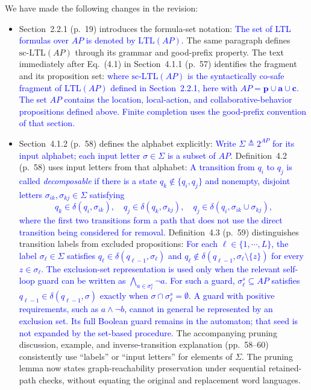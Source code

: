 \documentclass[11pt]{article}
\newcommand{\change}[1]{\textcolor{blue}{#1}}
\begin{document}
We have made the following changes in the revision:
\begin{itemize}
\item Section~2.2.1 (p.~19) introduces the formula-set notation:
\change{The set of LTL formulas over $AP$ is denoted by $\mathrm{LTL}(AP)$.}
The same paragraph defines $\mathrm{sc\mbox{-}LTL}(AP)$ through its grammar
and good-prefix property. The text immediately after Eq.~(4.1) in
Section~4.1.1 (p.~57) identifies the fragment and its proposition set:
\change{where $\mathrm{sc\mbox{-}LTL}(AP)$ is the syntactically co-safe fragment
of $\mathrm{LTL}(AP)$ defined in Section~2.2.1,
here with $AP=\mathbf{p}\cup\mathbf{a}\cup\mathbf{c}$.
The set $AP$ contains the location, local-action, and collaborative-behavior
propositions defined above.
Finite completion uses the good-prefix convention of that section.}
\item Section~4.1.2 (p.~58) defines the alphabet explicitly:
\change{Write $\Sigma\triangleq2^{AP}$ for its input alphabet; each input
letter $\sigma\in\Sigma$ is a subset of $AP$.}
Definition~4.2 (p.~58) uses input letters from that alphabet:
\change{A transition from $q_i$ to $q_j$ is called \emph{decomposable} if
there is a state $q_k\notin\{q_i,q_j\}$ and nonempty, disjoint letters
$\sigma_{ik},\sigma_{kj}\in\Sigma$ satisfying
\[
q_k\in\delta(q_i,\sigma_{ik}),\quad
q_j\in\delta(q_k,\sigma_{kj}),\quad
q_j\in\delta(q_i,\sigma_{ik}\cup\sigma_{kj}),
\]
where the first two transitions form a path that does not use the direct
transition being considered for removal.}
Definition~4.3 (p.~59) distinguishes transition labels from excluded propositions:
\change{For each
$\ell \in \{1,\cdots,L\}$, the label $\sigma_{\ell}\in\Sigma$
satisfies $q_{\ell}\in\delta(q_{\ell-1},\sigma_{\ell})$ and
$q_{\ell}\notin\delta(q_{\ell-1},\sigma_{\ell}\setminus\{z\})$ for every
$z\in\sigma_{\ell}$.}
\change{The exclusion-set representation is used only when the relevant
self-loop guard can be written as
$\bigwedge_{a\in\sigma_\ell^s}\neg a$.
For such a guard, $\sigma_\ell^s\subseteq AP$ satisfies
$q_{\ell-1}\in\delta(q_{\ell-1},\sigma)$ exactly when
$\sigma\cap\sigma_\ell^s=\emptyset$.
A guard with positive requirements, such as $a\wedge\neg b$, cannot in
general be represented by an exclusion set. Its full Boolean guard remains
in the automaton; that seed is not expanded by the set-based procedure.}
The accompanying pruning discussion, example, and inverse-transition explanation
(pp.~58--60) consistently use ``labels'' or ``input letters'' for elements
of $\Sigma$. The pruning lemma now states graph-reachability preservation
under sequential retained-path checks, without equating the original and
replacement word languages.
\end{itemize}
\end{document}
